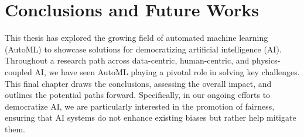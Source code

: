 \chapter{Conclusions and Future Works}
\label{epilogue:conclusions}



This thesis has explored the growing field of automated machine learning (AutoML) to showcase solutions for democratizing artificial intelligence (AI).
Throughout a research path across data-centric, human-centric, and physics-coupled AI, we have seen AutoML playing a pivotal role in solving key challenges.
This final chapter draws the conclusions, assessing the overall impact,
and outlines the potential paths forward.
Specifically, in our ongoing efforts to democratize AI, we are particularly interested in the promotion of fairness, ensuring that AI systems do not enhance existing biases but rather help mitigate them.



